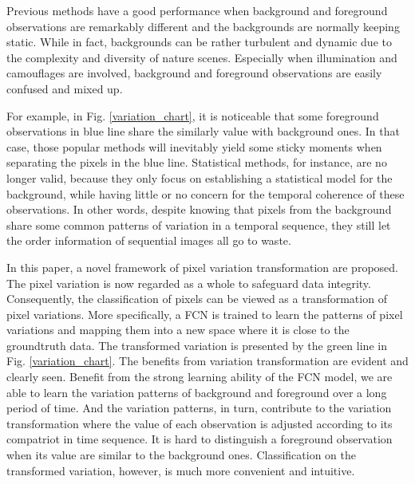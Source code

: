 \documentclass[journal]{IEEEtran}
\newcommand{\reffig}[1]{Fig. \ref{#1}}
\begin{document}

Previous methods have a good performance when background and foreground observations are remarkably different and the backgrounds are normally keeping static. 
While in fact, backgrounds can be rather turbulent and dynamic due to the complexity and diversity of nature scenes. 
Especially when illumination and camouflages are involved, background and foreground observations are easily confused and mixed up. 

For example, in \reffig{variation_chart}, it is noticeable that some foreground observations in blue line share the similarly value with background ones. 
In that case, those popular methods will inevitably yield some sticky moments when separating the pixels in the blue line. 
Statistical methods, for instance, are no longer valid, because they only focus on establishing a statistical model for the background, while having little or no concern for the temporal coherence of these observations. 
In other words, despite knowing that pixels from the background share some common patterns of variation in a temporal sequence, they still let the order information of sequential images all go to waste. 



In this paper, a novel framework of pixel variation transformation are proposed. %
The pixel variation is now regarded as a whole to safeguard data integrity.
Consequently, the classification of pixels can be viewed as a transformation of pixel variations. 
More specifically, a FCN is trained to learn the patterns of pixel variations and mapping them into a new space where it is close to the groundtruth data.
The transformed variation is presented by the green line in \reffig{variation_chart}. 
The benefits from variation transformation are evident and clearly seen. 
Benefit from the strong learning ability of the FCN model, we are able to learn the variation patterns of background and foreground over a long period of time.
And the variation patterns, in turn, contribute to the variation transformation where the value of each observation is adjusted according to its compatriot in time sequence.
It is hard to distinguish a foreground observation when its value are similar to the background ones. 
Classification on the transformed variation, however, is much more convenient and intuitive. 
\end{document}
